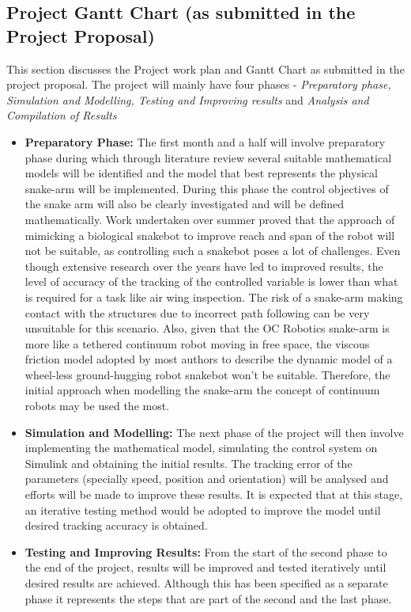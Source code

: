 \documentclass[a4paper,12pt]{report}
\begin{document}
\begin{appendices}
	\chapter{Project Gantt Chart {\normalsize (as submitted in the Project Proposal)}}
	This section discusses the Project work plan and Gantt Chart as submitted in the project proposal.
	The project will mainly have four phases - \textit{Preparatory phase, Simulation and Modelling, Testing and Improving results} and \textit{Analysis and Compilation of Results}
	\begin{itemize}
		\item \textbf{Preparatory Phase:} The first month and a half will involve preparatory phase during which through literature review several suitable mathematical models will be identified and the model that best represents the physical snake-arm will be implemented. During this phase the control objectives of the snake arm will also be clearly investigated and will be defined mathematically.
		Work undertaken over summer proved that the approach of mimicking a biological snakebot to improve reach and span of the robot will not be suitable, as controlling such a snakebot poses a lot of challenges. Even though extensive research over the years have led to improved results, the level of accuracy of the tracking of the controlled variable is lower than what is required for a task like air wing inspection. The risk of a snake-arm making contact with the structures due to incorrect path following can be very unsuitable for this scenario. Also, given that the OC Robotics snake-arm is more like a tethered continuum robot moving in free space, the viscous friction model adopted by most authors to describe the dynamic model of a wheel-less ground-hugging robot snakebot won’t be suitable. Therefore, the initial approach when modelling the snake-arm the concept of continuum robots may be used the most.
		\item \textbf{Simulation and Modelling:} The next phase of the project will then involve implementing the mathematical model, simulating the control system on Simulink and obtaining the initial results. The tracking error of the parameters (specially speed, position and orientation) will be analysed and efforts will be made to improve these results. It is expected that at this stage, an iterative testing method would be adopted to improve the model until desired tracking accuracy is obtained.
		\item \textbf{Testing and Improving Results:} From the start of the second phase to the end of the project, results will be improved and tested iteratively until desired results are achieved. Although this has been specified as a separate phase it represents the steps that are part of the second and the last phase. 

\end{itemize}
\end{appendices}
\end{document}
